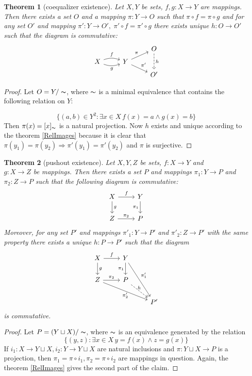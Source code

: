\documentclass[a4paper, 12pt]{article}
\newtheorem{thm}{Theorem}
\begin{document}
\begin{thm}[coequalizer existence]
    Let $X, Y$ be sets, $f, g:X\to Y$ are mappings. Then there exists
    a set $O$ and a mapping $\pi: Y\to O$ such that $\pi\circ f=\pi\circ g$
    and for any set $O'$ and mapping $\pi':Y\to O',\; \pi'\circ f = \pi'\circ g$
    there exists unique $h:O\to O'$ such that 
    the diagram is commutative: 
    \[
    \begin{tikzcd}[row sep=tiny]
        &                     &   O\arrow[dd, dashrightarrow, "h"]\\ 
        X\arrow[r, bend left=20, "f"]\arrow[r, bend right=20, "g"{below}]& Y\arrow[ur, "\pi"]\arrow[dr, "\pi'"] & \\
        &                     &   O'
    \end{tikzcd}
    \]
\end{thm}
\begin{proof}
    Let $O=Y/\thicksim$, where $\thicksim$ is a minimal equivalence that contains the following 
    relation on $Y$:

    \[
        \{(a, b)\in Y^2: \exists x\in X\,f(x)=a \land  g(x)=b\}
    \]
    Then $\pi(x)=[x]_\thicksim$ is a natural projection.
    Now $h$ exists and unique according to the theorem \ref{RelImages}
    because it is clear that $\pi(y_1)=\pi(y_2) \Rightarrow
    \pi'(y_1)=\pi'(y_2)$ and $\pi$ is surjective.
\end{proof}
\begin{thm}[pushout existence]
Let $X, Y, Z$ be sets, $f:X\to Y$ and\\ $g:X\to Z$ be mappings. Then there exists a set $P$
and mappings $\pi_1: Y\to P$ and $\pi_2: Z\to P$ such that the following diagram is commutative:
\[
    \begin{tikzcd}
       X\arrow[r, "f"]\arrow[d, "g"] & Y\arrow[d, "\pi_1"{left}]\\
       Z\arrow[r, "\pi_2"] & P
    \end{tikzcd}
\]
Moreover, for any set $P'$ and 
mappings $\pi'_1:Y\to P'$ and $\pi'_2:Z\to P'$ with the same property there exists a unique $h:P\to P'$ 
such that the diagram
\[
    \begin{tikzcd}
       X\arrow[r, "f"]\arrow[d, "g"] & Y\arrow[d, "\pi_1"{left}]\arrow[ddr, "\pi'_1"] & \\
       Z\arrow[r, "\pi_2"]\arrow[drr, "\pi'_2"{below}] & P\arrow[dr, dashrightarrow, "h"{above}] & \\
       & & P'
    \end{tikzcd}
\]
is commutative.
\end{thm}
\begin{proof}
    Let $P=(Y\sqcup X)/\thicksim$, where $\thicksim$ is an equivalence generated 
    by the relation 
    \[
        \{(y, z): \exists x\in X\, y = f(x)\land z=g(x) \}
    \]
    If $i_1:X\to Y\sqcup X, i_2:Y\to Y\sqcup X$ are natural inclusions
    and $\pi: Y\sqcup X\to P$ is a projection,
    then $\pi_1=\pi \circ i_1, \pi_2=\pi \circ i_2$ are mappings in question.
    Again, the theorem \ref{RelImages} gives the second part of the claim.
\end{proof}
\end{document}
